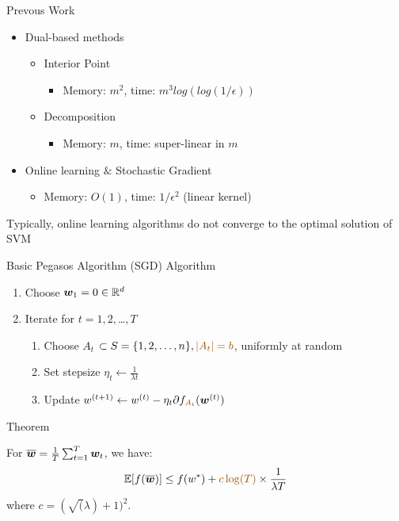 \begin{frame}{Prevous Work}
    \begin{itemize}
        \item Dual-based methods
            \begin{itemize}
                \item Interior Point
                    \begin{itemize}
                        \item Memory: $m^2$, time: $m^3 log(log(1/\epsilon))$
                    \end{itemize}
                \item Decomposition
                    \begin{itemize}
                        \item Memory: $m$, time: super-linear in $m$
                    \end{itemize}
            \end{itemize}
        \item Online learning $\&$ Stochastic Gradient
            \begin{itemize}
                \item Memory: $O(1)$, time: $1/\epsilon^2$ (linear kernel)
            \end{itemize}
    \end{itemize}
    Typically, online learning algorithms do not converge to the optimal solution of SVM
\end{frame}

\begin{frame}{Basic Pegasos Algorithm (SGD)}
    {\color{blue} Algorithm}

    \begin{enumerate} 
        \item Choose $\bm{w}_1 = 0 \in \mathbb{R}^d$
        \item Iterate for $t = 1,2,$\ldots$,T$
        \begin{enumerate}
            \item Choose {\color{red} $A_t$} $\subset S = \{1,2,\ldots,n\},{\color{red}|A_t|=b}$, uniformly at random
            \item Set stepsize $\eta_t \leftarrow \frac{1}{\lambda t}$
            \item Update $w^{(t+1)} \leftarrow w^{(t)} - \eta_t \partial f_{{\color{red}A_t}}(\wv^{ (t)})$
        \end{enumerate}
    \end{enumerate}

    {\color{blue} Theorem}

    For $\overline{\bm{w}} = \frac1T \sum_{t=1}^T \bm{w}_t $, we have:
    \[
        \E[f(\overline{\wv})]\le f(w^*) + {\color{red} c\log(T)}\times \frac{1}{\lambda T}
    \]
    where $c=(\sqrt(\lambda)+1)^2$.
\end{frame}

